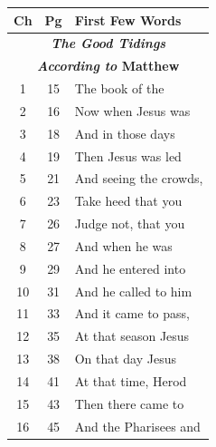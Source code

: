 \documentclass{article}
\newlength{\minipageheight}
\newlength{\minipagewidth}
\begin{document}
%
%
\begin{minipage}[r][\minipageheight][t]{\minipagewidth}%
    \begin{longtable}{ccl}
        \textbf{Ch} & \textbf{Pg}   & \textbf{First Few Words}        \\%
        \hline%
        \endfirsthead%
        \multicolumn{3}{c}{\textbf{\textit{The Good Tidings}}}        \\
        \multicolumn{3}{c}{\textbf{\textit{According to} Matthew}}    \\
        \hline
        1           & 15            & The book of the                 \\
        2           & 16            & Now when Jesus was              \\
        3           & 18            & And in those days               \\
        4           & 19            & Then Jesus was led              \\
        5           & 21            & And seeing the crowds,          \\
        6           & 23            & Take heed that you              \\
        7           & 26            & Judge not, that you             \\
        8           & 27            & And when he was                 \\
        9           & 29            & And he entered into             \\
        10          & 31            & And he called to him            \\
        11          & 33            & And it came to pass,            \\
        12          & 35            & At that season Jesus            \\
        13          & 38            & On that day Jesus               \\
        14          & 41            & At that time, Herod             \\
        15          & 43            & Then there came to              \\
        16          & 45            & And the Pharisees and           \\

\end{longtable}
\end{minipage}
\end{document}

